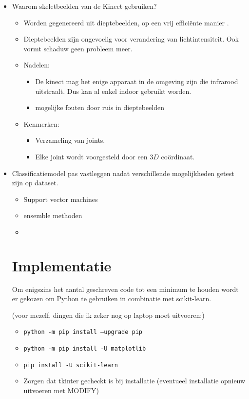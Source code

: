 \begin{itemize}
	\item Waarom skeletbeelden van de Kinect gebruiken?
	\begin{itemize}
		\item Worden gegenereerd uit dieptebeelden, op een vrij efficiënte manier \cite{Shotton2011}.
		\item Dieptebeelden zijn ongevoelig voor verandering van lichtintensiteit. Ook vormt schaduw geen probleem meer.
		\item Nadelen:
		\begin{itemize}
			\item De kinect mag het enige apparaat in de omgeving zijn die infrarood uitstraalt. Dus kan al enkel indoor gebruikt worden.
			\item mogelijke fouten door ruis in dieptebeelden
		\end{itemize}
		\item Kenmerken:
		\begin{itemize}
			\item Verzameling van joints.
			\item Elke joint wordt voorgesteld door een $3D$ coördinaat.
		\end{itemize}
			
	\end{itemize}






	\item Classificatiemodel pas vastleggen nadat verschillende mogelijkheden getest zijn op dataset.
	\begin{itemize}
		\item Support vector machines
		\item ensemble methoden
		\item {}
	\end{itemize}


\section{Implementatie}
Om enigszins het aantal geschreven code tot een minimum te houden wordt er gekozen om Python te gebruiken in combinatie met scikit-learn.

(voor mezelf, dingen die ik zeker nog op laptop moet uitvoeren:)
\begin{itemize}
	\item \texttt{python -m pip install --upgrade pip}
	\item \texttt{python -m pip install -U matplotlib}
	\item \texttt{pip install -U scikit-learn}
	\item Zorgen dat tkinter gecheckt is bij installatie (eventueel installatie opnieuw uitvoeren met MODIFY)
\end{itemize}
\end{itemize}